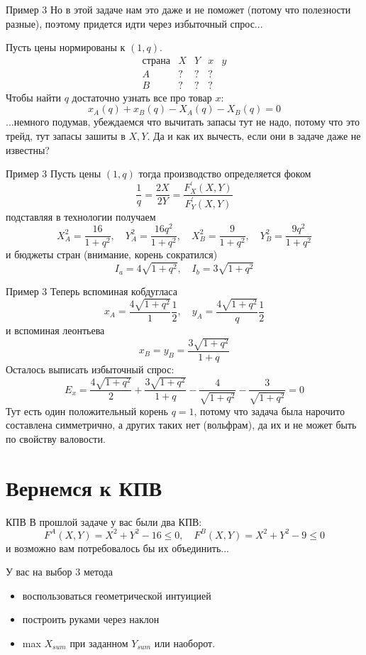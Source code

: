 \documentclass{beamer}
\begin{document}
\begin{frame}{Пример 3}
Но в этой задаче нам это даже и не поможет (потому что полезности разные), поэтому придется идти через избыточный спрос...

Пусть цены нормированы к $(1,q)$.
$$\begin{array}{c|c|c|c|c}
  \text{страна} & X & Y & x & y \\
  \hline
  A & ? & ? & ? &\\
  \hline
  B & ? & ? & ? &
\end{array}$$
Чтобы найти $q$ достаточно узнать все про товар $x$:
$$ x_A(q) + x_B(q) - X_A(q) - X_B(q) = 0$$
...немного подумав, убеждаемся что \alert{вычитать запасы тут не надо, потому что это трейд, тут запасы зашиты в $X,Y$}. Да и как их вычесть, если они в задаче даже не известны?
\end{frame}

\begin{frame}{Пример 3}
Пусть цены $(1,q)$ тогда производство определяется фоком
$$ \frac{1}{q} = \frac{2X}{2Y} = \frac{F^{'}_X(X,Y)}{F^{'}_Y(X,Y)}$$
подставляя в технологии получаем
$$X_A^2 = \frac{16}{1+q^2}, \quad Y_A^2 = \frac{16 q^2}{1+q^2}, \quad X_B^2 = \frac{9}{1+q^2}, \quad Y_B^2 = \frac{9 q^2}{1+q^2} $$
и бюджеты стран (внимание, корень сократился)
$$ I_a = 4 \sqrt{1+q^2}, \quad I_b = 3 \sqrt{1+q^2}$$
\end{frame}

\begin{frame}{Пример 3}
Теперь вспоминая кобдугласа
$$x_A = \frac{4 \sqrt{1+q^2}}{1}\frac{1}{2}, \quad y_A = \frac{4 \sqrt{1+q^2}}{q}\frac{1}{2}$$
и вспоминая леонтьева
$$x_B = y_B = \frac{3 \sqrt{1+q^2}}{1+q}$$
Осталось выписать избыточный спрос:
$$ E_x = \frac{4 \sqrt{1+q^2}}{2} + \frac{3 \sqrt{1+q^2}}{1+q} - \frac{4}{\sqrt{1+q^2}} - \frac{3}{\sqrt{1+q^2}} = 0$$
Тут есть один положительный корень $q=1$, потому что задача была нарочито составлена симметрично, а других таких нет (вольфрам), да их и не может быть по свойству валовости.
\end{frame}

\section{Вернемся к КПВ}

\begin{frame}{КПВ}
В прошлой задаче у вас были два КПВ:
$$ F^A(X,Y) = X^2 + Y^2 - 16 \leqslant 0, \quad F^B(X,Y) = X^2 + Y^2 - 9 \leqslant 0$$
и возможно вам потребовалось бы их объединить...

У вас на выбор 3 метода
\begin{itemize}
  \item воспользоваться геометрической интуицией
  \item построить руками через наклон
  \item max $X_{sum}$ при заданном $Y_{sum}$ или наоборот.
\end{itemize}
\end{frame}
\end{document}

